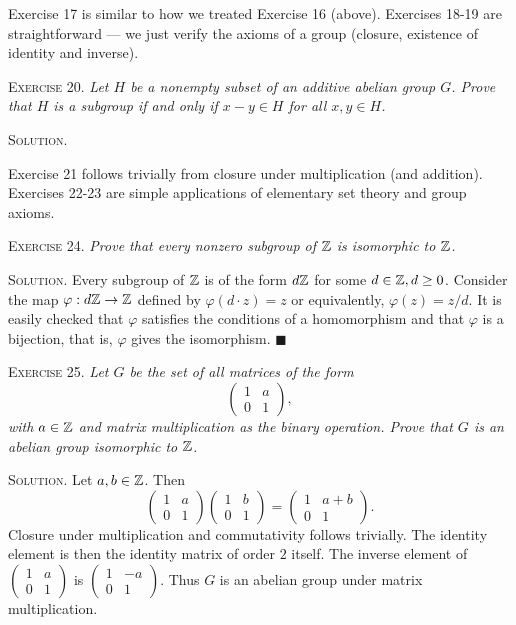 \documentclass[11pt, leqno]{article}
\newcommand{\done}{\ensuremath{\blacksquare}}
\begin{document}
Exercise 17 is similar to how we treated Exercise 16 (above). Exercises 18-19 are straightforward --- we just verify the axioms of a group (closure, existence of identity and inverse).

\textsc{Exercise 20}. \emph{Let $H$ be a nonempty subset of an additive abelian group $G$. Prove that $H$ is a subgroup if and only if $x-y \in H$ for all $x,y\in H$.}

\textsc{Solution}.

Exercise 21 follows trivially from closure under multiplication (and addition). Exercises 22-23 are simple applications of elementary set theory and group axioms.

\textsc{Exercise 24}. \emph{Prove that every nonzero subgroup of $\mathbb{Z}$ is isomorphic to $\mathbb{Z}$.}

\textsc{Solution}. Every subgroup of $\mathbb{Z}$ is of the form $d\mathbb{Z}$ for some $d\in\mathbb{Z}, d\geq 0$. Consider the map $\varphi: d\mathbb{Z} \to \mathbb{Z}$ defined by $\varphi (d\cdot z) = z$ or equivalently, $\varphi(z) = z/d$. It is easily checked that $\varphi$ satisfies the conditions of a homomorphism and that $\varphi$ is a bijection, that is, $\varphi$ gives the isomorphism. \done

\textsc{Exercise 25}. \emph{Let $G$ be the set of all matrices of the form 
\begin{displaymath}
\begin{pmatrix} 1 & a \\ 0 & 1 \end{pmatrix},
\end{displaymath}
with $a\in\mathbb{Z}$ and matrix multiplication as the binary operation. Prove that $G$ is an abelian group isomorphic to $\mathbb{Z}$.}

\textsc{Solution}. Let $a, b \in \mathbb{Z}$. Then 
\begin{displaymath}
\begin{pmatrix} 1 & a \\ 0 & 1 \end{pmatrix} \begin{pmatrix} 1 & b \\ 0 & 1 \end{pmatrix} = \begin{pmatrix} 1 & a+b \\ 0 & 1 \end{pmatrix}.
\end{displaymath} Closure under multiplication and commutativity follows trivially. The identity element is then the identity matrix of order $2$ itself. The inverse element of $\displaystyle \begin{pmatrix} 1 & a \\ 0 & 1 \end{pmatrix}$ is $\displaystyle \begin{pmatrix} 1 & -a \\ 0 & 1 \end{pmatrix}$. Thus $G$ is an abelian group under matrix multiplication.
\end{document}
